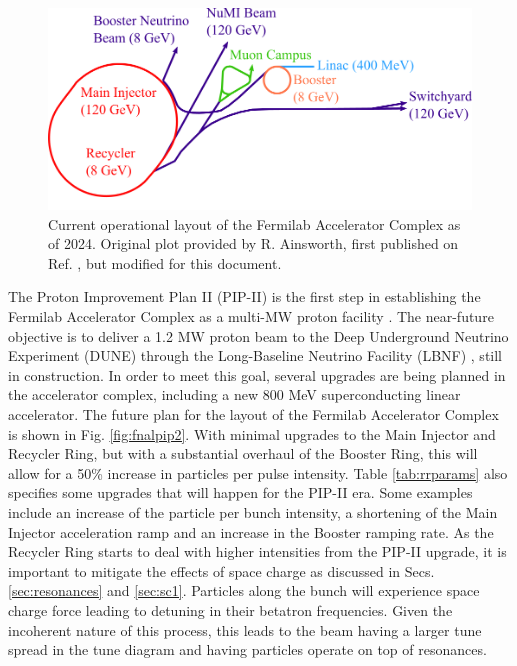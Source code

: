 \begin{figure}[H]
   \centering
   \includegraphics[width=\columnwidth]{chapter3/complex_noTev.png}
   \caption{Current operational layout of the Fermilab Accelerator Complex as of 2024. Original plot provided by R. Ainsworth, first published on Ref. \cite{rr1}, but modified for this document.}
   \label{fig:fnal}
\end{figure}

The Proton Improvement Plan II (PIP-II) is the first step in establishing the Fermilab Accelerator Complex as a multi-MW proton facility \cite{pipII1}. The near-future objective is to deliver a 1.2 MW proton beam to the Deep Underground Neutrino Experiment (DUNE) through the Long-Baseline Neutrino Facility (LBNF) \cite{dune}, still in construction. In order to meet this goal, several upgrades are being planned in the accelerator complex, including a new 800 MeV superconducting linear accelerator. The future plan for the layout of the Fermilab Accelerator Complex is shown in Fig. \ref{fig:fnalpip2}. With minimal upgrades to the Main Injector and Recycler Ring, but with a substantial overhaul of the Booster Ring, this will allow for a 50\% increase in particles per pulse intensity. Table \ref{tab:rrparams} also specifies some upgrades that will happen for the PIP-II era. Some examples include an increase of the particle per bunch intensity, a shortening of the Main Injector acceleration ramp and an increase in the Booster ramping rate. As the Recycler Ring starts to deal with higher intensities from the PIP-II upgrade, it is important to mitigate the effects of space charge as discussed in Secs. \ref{sec:resonances} and \ref{sec:sc1}. Particles along the bunch will experience space charge force leading to detuning in their betatron frequencies. Given the incoherent nature of this process, this leads to the beam having a larger tune spread in the tune diagram and having particles operate on top of resonances.

